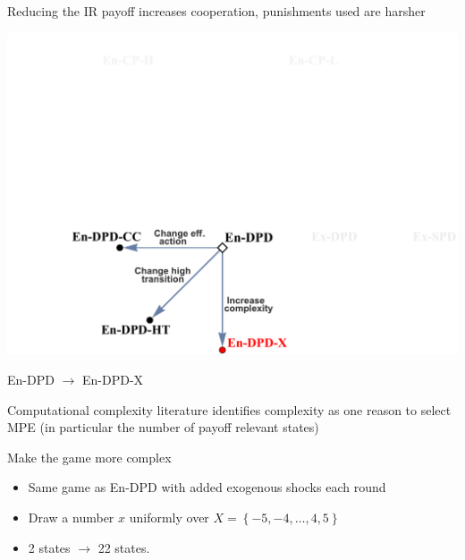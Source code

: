 \documentclass{beamer}
\begin{document}
\begin{frame}

\begin{card}[Result 3:]
Reducing the IR payoff increases cooperation, punishments
used are harsher
\end{card}
\end{frame}

\begin{frame}
\begin{card}
\begin{center}\includegraphics[height=0.7\textwidth]{./i/FlowChart4.pdf}
\end{center}
\end{card}
\end{frame}


\begin{frame}{En-DPD $\rightarrow$ En-DPD-X}

\begin{card}
Computational complexity literature identifies complexity as one reason
to select MPE (in particular the number of payoff relevant states)
\end{card}
\pause

\begin{card}[Manipulation 3:] 
Make the game more complex
    \begin{itemize}
    \item Same game as En-DPD with added exogenous shocks each round
    \item Draw a number $x$ uniformly over $X=\left\{ -5,-4,\ldots,4,5\right\} $
    \item 2 states $\rightarrow$ 22 states.
    \end{itemize}
\end{card}
\end{frame}
\end{document}
